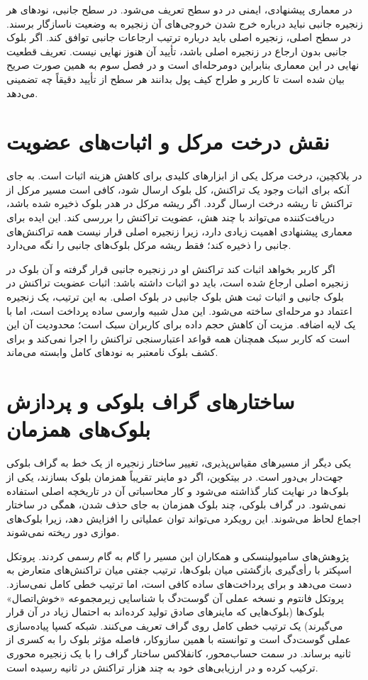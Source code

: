در معماری پیشنهادی، ایمنی در دو سطح تعریف می‌شود. در سطح جانبی، نودهای هر زنجیره جانبی نباید درباره خرج شدن خروجی‌های آن زنجیره به وضعیت ناسازگار برسند. در سطح اصلی، زنجیره اصلی باید درباره ترتیب ارجاعات جانبی توافق کند. اگر بلوک جانبی بدون ارجاع در زنجیره اصلی باشد، تأیید آن هنوز نهایی نیست. تعریف قطعیت نهایی در این معماری بنابراین دومرحله‌ای است و در فصل سوم به همین صورت صریح بیان شده است تا کاربر و طراح کیف پول بدانند هر سطح از تأیید دقیقاً چه تضمینی می‌دهد.

\section{نقش درخت مرکل و اثبات‌های عضویت}

در بلاکچین، درخت مرکل یکی از ابزارهای کلیدی برای کاهش هزینه اثبات است. به جای آنکه برای اثبات وجود یک تراکنش، کل بلوک ارسال شود، کافی است مسیر مرکل از تراکنش تا ریشه درخت ارسال گردد. اگر ریشه مرکل در هدر بلوک ذخیره شده باشد، دریافت‌کننده می‌تواند با چند هش، عضویت تراکنش را بررسی کند. این ایده برای معماری پیشنهادی اهمیت زیادی دارد، زیرا زنجیره اصلی قرار نیست همه تراکنش‌های جانبی را ذخیره کند؛ فقط ریشه مرکل بلوک‌های جانبی را نگه می‌دارد.

اگر کاربر بخواهد اثبات کند تراکنش او در زنجیره جانبی قرار گرفته و آن بلوک در زنجیره اصلی ارجاع شده است، باید دو اثبات داشته باشد: اثبات عضویت تراکنش در بلوک جانبی و اثبات ثبت هش بلوک جانبی در بلوک اصلی. به این ترتیب، یک زنجیره اعتماد دو مرحله‌ای ساخته می‌شود. این مدل شبیه وارسی ساده پرداخت است، اما با یک لایه اضافه. مزیت آن کاهش حجم داده برای کاربران سبک است؛ محدودیت آن این است که کاربر سبک همچنان همه قواعد اعتبارسنجی تراکنش را اجرا نمی‌کند و برای کشف بلوک نامعتبر به نودهای کامل وابسته می‌ماند.

\section{ساختارهای گراف بلوکی و پردازش بلوک‌های همزمان}

یکی دیگر از مسیرهای مقیاس‌پذیری، تغییر ساختار زنجیره از یک خط به گراف بلوکی جهت‌دار بی‌دور است. در بیتکوین، اگر دو ماینر تقریباً همزمان بلوک بسازند، یکی از بلوک‌ها در نهایت کنار گذاشته می‌شود و کار محاسباتی آن در تاریخچه اصلی استفاده نمی‌شود. در گراف بلوکی، چند بلوک همزمان به جای حذف شدن، همگی در ساختار اجماع لحاظ می‌شوند. این رویکرد می‌تواند توان عملیاتی را افزایش دهد، زیرا بلوک‌های موازی دور ریخته نمی‌شوند.

پژوهش‌های سامپولینسکی و همکاران این مسیر را گام به گام رسمی کردند. پروتکل اسپکتر با رأی‌گیری بازگشتی میان بلوک‌ها، ترتیب جفتی میان تراکنش‌های متعارض به دست می‌دهد و برای پرداخت‌های ساده کافی است، اما ترتیب خطی کامل نمی‌سازد. پروتکل فانتوم و نسخه عملی آن گوست‌دگ با شناسایی زیرمجموعه «خوش‌اتصال» بلوک‌ها (بلوک‌هایی که ماینرهای صادق تولید کرده‌اند به احتمال زیاد در آن قرار می‌گیرند) یک ترتیب خطی کامل روی گراف تعریف می‌کنند. شبکه کسپا پیاده‌سازی عملی گوست‌دگ است و توانسته با همین سازوکار، فاصله مؤثر بلوک را به کسری از ثانیه برساند. در سمت حساب‌محور، کانفلاکس ساختار گراف را با یک زنجیره محوری ترکیب کرده و در ارزیابی‌های خود به چند هزار تراکنش در ثانیه رسیده است.

